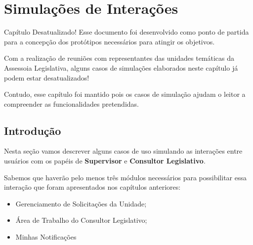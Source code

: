 \chapter{Simulações de Interações}
\label{detalhes:modulos-simula}

\newcommand{\euni}[1]{\colorbox{yellow!50}{\textbf{#1}}}
\newcommand{\ecl}[1]{\colorbox{orange!50}{\textbf{#1}}}


\begin{nota}{Capítulo Desatualizado!}
	Esse documento foi desenvolvido como ponto de partida para a concepção dos protótipos necessários para atingir os objetivos.
	
	Com a realização de reuniões com representantes das unidades temáticas da Assessoia Legislativa, alguns casos de simulações elaborados neste capítulo já podem estar desatualizados!
	
	\tcblower
	
	Contudo, esse capítulo foi mantido pois os casos de simulação ajudam o leitor a compreender as funcionalidades pretendidas.
\end{nota}

\section*{Introdução}

Nesta seção vamos descrever alguns casos de uso simulando as interações entre usuários com os papéis de \textbf{Supervisor} e \textbf{Consultor Legislativo}.

Sabemos que haverão pelo menos três módulos necessários para possibilitar essa interação que foram apresentados nos capítulos anteriores:

\begin{itemize}
	\item Gerenciamento de Solicitações da Unidade;
	\item Área de Trabalho do Consultor Legislativo;
	\item Minhas Notificações
\end{itemize}


